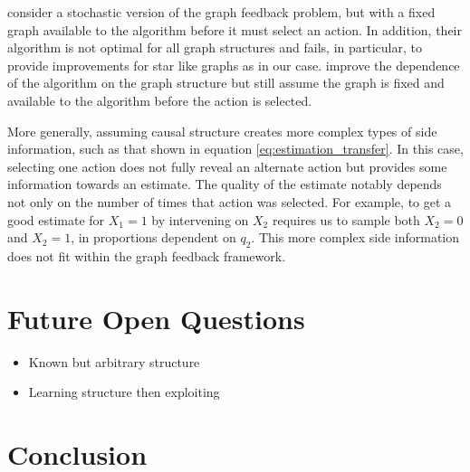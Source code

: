 \documentclass{article}
\theoremstyle{plain}
\theoremstyle{definition}
\begin{document}
\cite{Lelarge2012} consider a stochastic version of the graph feedback problem, but with a fixed graph available to the algorithm before it must select an action. In addition, their algorithm is not optimal for all graph structures and fails, in particular, to provide improvements for star like graphs as in our case. \cite{Buccapatnam2014} improve the dependence of the algorithm on the graph structure but still assume the graph is fixed and available to the algorithm before the action is selected. 

More generally, assuming causal structure creates more complex types of side information, such as that shown in equation \ref{eq:estimation_transfer}. In this case, selecting one action does not fully reveal an alternate action but provides some information towards an estimate. The quality of the estimate notably depends not only on the number of times that action was selected. For example, to get a good estimate for $X_1 = 1$ by intervening on $X_2$ requires us to sample both $X_2=0$ and $X_2=1$, in proportions dependent on $q_2$. This more complex side information does not fit within the graph feedback framework.


\section{Future Open Questions}
\begin{itemize}
\item Known but arbitrary structure
\item Learning structure then exploiting
\end{itemize}
\section{Conclusion}



\end{document}
